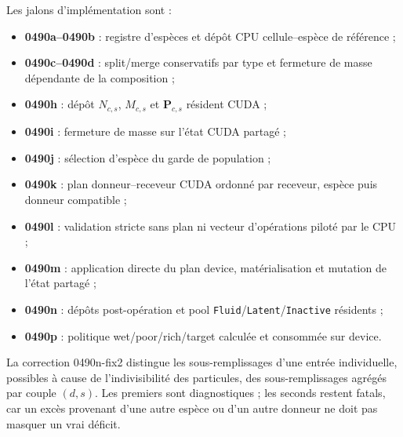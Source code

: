 \documentclass[11pt,a4paper]{article}
\begin{document}
Les jalons d'implémentation sont :
\begin{itemize}[nosep]
  \item \textbf{0490a--0490b} : registre d'espèces et dépôt CPU cellule--espèce de référence ;
  \item \textbf{0490c--0490d} : split/merge conservatifs par type et fermeture de masse dépendante de la composition ;
  \item \textbf{0490h} : dépôt $N_{c,s}$, $M_{c,s}$ et $\bm{P}_{c,s}$ résident CUDA ;
  \item \textbf{0490i} : fermeture de masse sur l'état CUDA partagé ;
  \item \textbf{0490j} : sélection d'espèce du garde de population ;
  \item \textbf{0490k} : plan donneur--receveur CUDA ordonné par receveur, espèce puis donneur compatible ;
  \item \textbf{0490l} : validation stricte sans plan ni vecteur d'opérations piloté par le CPU ;
  \item \textbf{0490m} : application directe du plan device, matérialisation et mutation de l'état partagé ;
  \item \textbf{0490n} : dépôts post-opération et pool \texttt{Fluid}/\texttt{Latent}/\texttt{Inactive} résidents ;
  \item \textbf{0490p} : politique wet/poor/rich/target calculée et consommée sur device.
\end{itemize}

La correction 0490n-fix2 distingue les sous-remplissages d'une entrée individuelle, possibles à cause de l'indivisibilité des particules, des sous-remplissages agrégés par couple $(d,s)$. Les premiers sont diagnostiques ; les seconds restent fatals, car un excès provenant d'une autre espèce ou d'un autre donneur ne doit pas masquer un vrai déficit.
\end{document}
